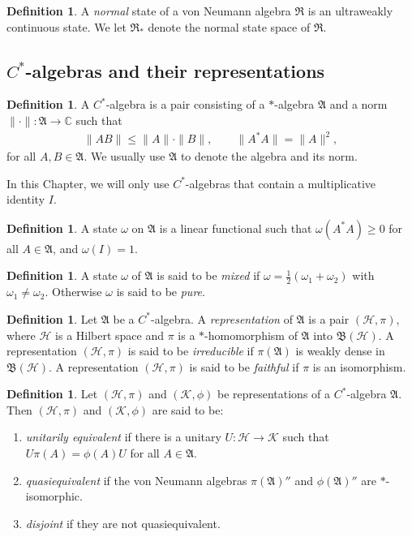 \documentclass[12pt]{article}
\newcommand{\alg}[1]{\mathfrak{#1}}
\newcommand{\norm}[1]{\| #1\|}
\newcommand{\bh}{\mathfrak{B}(\mathcal{H})}
\theoremstyle{definition}
\theoremstyle{definition}
\newtheorem{defn}[thm]{Definition}
\theoremstyle{remark}
\def\2#1{{\mathcal #1}}
\def\7#1{{\mathbb #1}}
\def\al#1{{\mathfrak #1}}
\def\om{\omega} \def\Om{\Omega} \def\dd{\partial} \def\D{\Delta}
\begin{document}
\begin{defn} A \emph{normal} state of a von Neumann algebra $\alg{R}$
  is an ultraweakly continuous state.  We let $\al R_*$ denote the
  normal state space of $\al R$.  \end{defn}


\subsection{$C^*$-algebras and their representations}

\begin{defn} A $C^*$-algebra is a pair consisting of a $*$-algebra
  $\al A$ and a norm $\norm{\cdot}:\al A\to \7C$ such that
  \begin{eqnarray*}
    \norm{AB}\leq \norm{A}\cdot \norm{B} ,\qquad \norm{A^*A}=\norm{A}^2
    ,\end{eqnarray*} 
  for all $A,B\in \alg{A}$.  We usually use $\al A$ to denote the
  algebra and its norm.    
\end{defn}

In this Chapter, we will only use $C^*$-algebras that contain a
multiplicative identity $I$.

\begin{defn} A state $\om$ on $\alg{A}$ is a linear functional such
  that $\om (A^*A)\geq 0$ for all $A\in \alg{A}$, and $\om (I)=1$.
\end{defn}

\begin{defn} A state $\om$ of $\alg{A}$ is said to be \emph{mixed} if
  $\om =\frac{1}{2}(\om _1+\om _2)$ with $\om _1\neq \om _2$.
  Otherwise $\om$ is said to be \emph{pure}.  \end{defn}

\begin{defn} Let $\alg{A}$ be a $C^*$-algebra.  A
  \emph{representation} of $\alg{A}$ is a pair $(\2H ,\pi )$, where
  $\2H$ is a Hilbert space and $\pi$ is a $*$-homomorphism of
  $\alg{A}$ into $\bh$.  A representation $(\2H ,\pi )$ is said to be
  \emph{irreducible} if $\pi (\alg{A})$ is weakly dense in $\bh$.  A
  representation $(\2H ,\pi )$ is said to be \emph{faithful} if $\pi$
  is an isomorphism.  \end{defn}

\begin{defn} Let $(\2H ,\pi )$ and $(\2K ,\phi )$ be representations
  of a $C^*$-algebra $\alg{A}$.  Then $(\2H ,\pi )$ and $(\2K ,\phi )$
  are said to be:
  \begin{enumerate}
  \item \emph{unitarily equivalent} if there is a unitary $U:\2H \to
    \2K$ such that $U\pi (A)=\phi (A)U$ for all $A\in \alg{A}$.
  \item \emph{quasiequivalent} if the von Neumann algebras $\pi
    (\alg{A})''$ and $\phi (\alg{A})''$ are $*$-isomorphic.
  \item \emph{disjoint} if they are not quasiequivalent.
  \end{enumerate} \label{reps}
\end{defn}
\end{document}

